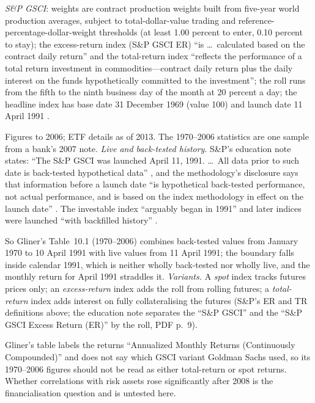 \begin{qfdefinition}
\emph{S\&P GSCI}: weights are contract production weights built from five-year world production averages, subject to total-dollar-value trading and reference-percentage-dollar-weight thresholds (at least 1.00 percent to enter, 0.10 percent to stay); the excess-return index (S\&P GSCI ER) ``is \dots\ calculated based on the contract daily return'' and the total-return index ``reflects the performance of a total return investment in commodities---contract daily return plus the daily interest on the funds hypothetically committed to the investment''; the roll runs from the fifth to the ninth business day of the month at 20 percent a day; the headline index has base date 31 December 1969 (value 100) and launch date 11 April 1991 \citep[PDF pp.~7, 9, 13 and~18, printed pp.~6, 8, 12 and~17]{spdji-gsci-methodology-2026}.

 Figures to 2006; ETF details as of 2013. The 1970--2006 statistics are one sample from a bank's 2007 note. \emph{Live and back-tested history}. S\&P's education note states: ``The S\&P GSCI was launched April 11, 1991. \dots\ All data prior to such date is back-tested hypothetical data'' \citep[PDF p.~6, notes to the exhibits]{spdji-why-gsci-2024}, and the methodology's disclosure says that information before a launch date ``is hypothetical back-tested performance, not actual performance, and is based on the index methodology in effect on the launch date'' \citep[PDF p.~39]{spdji-gsci-methodology-2026}. The investable index ``arguably began in 1991'' and later indices were launched ``with backfilled history'' \citep[p.~36]{dunsby-nelson-2010}.

So Gliner's Table~10.1 (1970--2006) combines back-tested values from January 1970 to 10 April 1991 with live values from 11 April 1991; the boundary falls inside calendar 1991, which is neither wholly back-tested nor wholly live, and the monthly return for April 1991 straddles it. \emph{Variants.} A \emph{spot} index tracks futures prices only; an \emph{excess-return} index adds the roll from rolling futures; a \emph{total-return} index adds interest on fully collateralising the futures (S\&P's ER and TR definitions above; the education note separates the ``S\&P GSCI'' and the ``S\&P GSCI Excess Return (ER)'' by the roll, PDF p.~9).

Gliner's table labels the returns ``Annualized Monthly Returns (Continuously Compounded)'' and does not say which GSCI variant Goldman Sachs used, so its 1970--2006 figures should not be read as either total-return or spot returns. Whether correlations with risk assets rose significantly after 2008 is the financialisation question and is untested here.


\end{qfdefinition}
